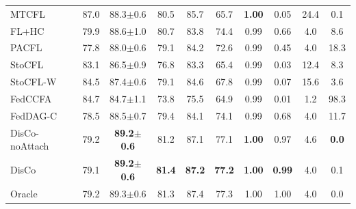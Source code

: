{\begin{tabular}{lccccccccc}
MTCFL & 87.0 & 88.3$\pm$0.6 & 80.5 & 85.7 & 65.7 & \textbf{1.00} & 0.05 & 24.4 & 0.1 \\
FL+HC & 79.9 & 88.6$\pm$1.0 & 80.7 & 83.8 & 74.4 & 0.99 & 0.66 & 4.0 & 8.6 \\
PACFL & 77.8 & 88.0$\pm$0.6 & 79.1 & 84.2 & 72.6 & 0.99 & 0.45 & 4.0 & 18.3 \\
StoCFL & 83.1 & 86.5$\pm$0.9 & 76.8 & 83.3 & 65.4 & 0.99 & 0.03 & 12.4 & 8.3 \\
StoCFL-W & 84.5 & 87.4$\pm$0.6 & 79.1 & 84.6 & 67.8 & 0.99 & 0.07 & 15.6 & 3.6 \\
FedCCFA & 84.7 & 84.7$\pm$1.1 & 73.8 & 75.5 & 64.9 & 0.99 & 0.01 & 1.2 & 98.3 \\
FedDAG-C & 78.5 & 88.5$\pm$0.7 & 79.4 & 84.1 & 74.1 & 0.99 & 0.68 & 4.0 & 11.7 \\
DisCo-noAttach & 79.2 & \textbf{89.2$\pm$0.6} & 81.2 & 87.1 & 77.1 & \textbf{1.00} & 0.97 & 4.6 & \textbf{0.0} \\
DisCo & 79.1 & \textbf{89.2$\pm$0.6} & \textbf{81.4} & \textbf{87.2} & \textbf{77.2} & \textbf{1.00} & \textbf{0.99} & 4.0 & 0.1 \\
Oracle & 79.2 & 89.3$\pm$0.6 & 81.3 & 87.4 & 77.3 & 1.00 & 1.00 & 4.0 & 0.0 \\
\bottomrule
\end{tabular}}
